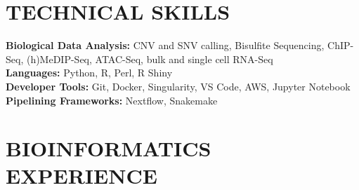 \documentclass[11pt,letterpaper,sans]{moderncv}        %
\makeatletter
\newcommand*{\customcvproject}[4][.25em]{
  \begin{tabular}{@{}l} 
    {\bfseries #2}
  \end{tabular}
  \hfill%
  \begin{tabular}{l@{}}
     {\itshape #3}
  \end{tabular}
  \ifx&#4&%
  \else{\\%
    \begin{minipage}{\maincolumnwidth}%
      \small#4%
    \end{minipage}}\fi%
  \par\addvspace{#1}}
\makeatother
\begin{document}

\section{TECHNICAL SKILLS}
\begin{minipage}{\maincolumnwidth}%
	\small{
	\textbf{Biological Data Analysis:}  CNV and SNV calling, Bisulfite Sequencing, ChIP-Seq, (h)MeDIP-Seq, ATAC-Seq, bulk and single cell RNA-Seq\\
	\textbf{Languages:} Python, R, Perl, R Shiny\\
	\textbf{Developer Tools:} Git, Docker,  Singularity, VS Code, AWS, Jupyter Notebook\\
	\textbf{Pipelining Frameworks:} Nextflow, Snakemake}%
\end{minipage}%

\section{BIOINFORMATICS EXPERIENCE}
\end{document}
